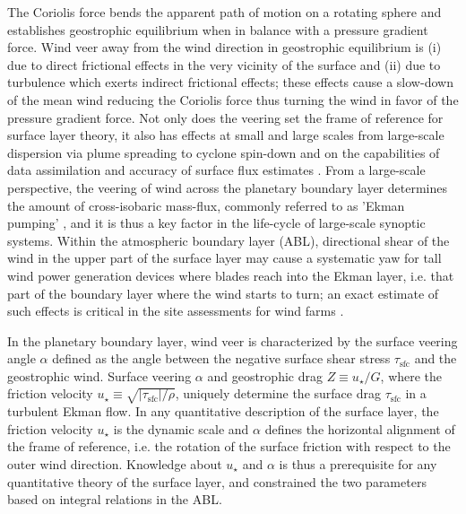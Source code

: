 \documentclass[smallcondensed,final]{svjour3}
\newcommand{\SFC}{\mathrm{sfc}}
\begin{document}
The Coriolis force bends the apparent path of motion on a rotating sphere and establishes geostrophic equilibrium when in balance with a pressure gradient force. Wind veer away from the wind direction in geostrophic equilibrium is
(i) due to direct frictional effects in the very vicinity of the surface and
(ii) due to turbulence which exerts indirect frictional effects; these effects
cause a slow-down of the mean wind reducing the Coriolis force thus turning the wind
in favor of the pressure gradient force. 
Not only does the veering set the frame of reference for surface layer theory, it also has
effects at small and large scales from large-scale dispersion via plume spreading to
cyclone spin-down \citep{svensson:BM2009}
and on the capabilities of data assimilation and accuracy of surface flux estimates \citep{brown:QJR2005}. 
%
From a large-scale perspective, the veering of wind across the planetary boundary layer determines
the amount of cross-isobaric mass-flux, commonly referred to as 'Ekman pumping' \citep{ekman:AMA1905},
and it is thus a key factor in the life-cycle of large-scale synoptic systems.
%
% 
Within the atmospheric boundary layer (ABL), directional shear of the wind in
the upper part of the surface layer may cause a systematic yaw for tall wind power generation devices
where blades reach into the Ekman layer, i.e. that part of the boundary layer where the wind starts to turn;
an exact estimate of such effects is critical in the site assessments for wind farms
\citep{calaf:PF2010, mirocha:WES2018}. 
%
\par
%
In the planetary boundary layer, wind veer is characterized by the surface veering angle $\alpha$
defined as the angle between the negative surface shear stress $\tau_\SFC$ and the geostrophic wind.
%
Surface veering $\alpha$ and geostrophic drag $Z\equiv u_\star/G$, where the friction velocity $u_\star\equiv\sqrt{|\tau_\SFC|/\rho}$,
uniquely determine the surface drag $\tau_\SFC$ in a turbulent Ekman flow. 
%
In any quantitative description of the surface layer, the friction velocity $u_\star$ is the dynamic scale
and $\alpha$ defines the horizontal alignment of the frame of reference, i.e. the rotation of the surface 
friction with respect to the outer wind direction. 
%
Knowledge about $u_\star$ and $\alpha$ is thus a prerequisite for any quantitative theory of the surface layer, 
and \citet{rossby:PIP1935} constrained the two parameters based on integral relations in the ABL.
\end{document}
